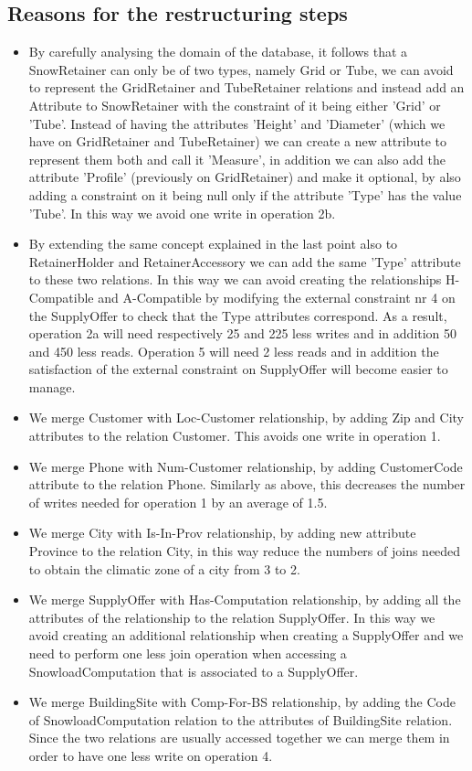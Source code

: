 {\subsection{Reasons for the restructuring steps}
\begin{itemize}
  \item By carefully analysing the domain of the database, it follows that a SnowRetainer can only be of two types, namely Grid or Tube, we can avoid to represent the GridRetainer and TubeRetainer relations and instead add an Attribute to SnowRetainer with the constraint of it being either 'Grid' or 'Tube'. Instead of having the attributes 'Height' and 'Diameter' (which we have on GridRetainer and TubeRetainer) we can create a new attribute to represent them both and call it 'Measure', in addition we can also add the attribute 'Profile' (previously on GridRetainer) and make it optional, by also adding a constraint on it being null only if the attribute 'Type' has the value 'Tube'. In this way we avoid one write in operation 2b.
  \item By extending the same concept explained in the last point also to RetainerHolder and RetainerAccessory we can add the same 'Type' attribute to these two relations. In this way we can avoid creating the relationships H-Compatible and A-Compatible by modifying the external constraint nr 4 on the SupplyOffer to check that the Type attributes correspond. As a result, operation 2a will need respectively 25 and 225 less writes and in addition 50 and 450 less reads. Operation 5 will need 2 less reads and in addition the satisfaction of the external constraint on SupplyOffer will become easier to manage.
  \item We merge Customer with Loc-Customer relationship, by adding Zip and City attributes to the relation Customer. This avoids one write in operation 1.
  \item We merge Phone with Num-Customer relationship, by adding CustomerCode attribute to the relation Phone. Similarly as above, this decreases the number of writes needed for operation 1 by an average of 1.5.
  \item We merge City with Is-In-Prov relationship, by adding new attribute Province to the relation City, in this way reduce the numbers of joins needed to obtain the climatic zone of a city from 3 to 2.
  \item We merge SupplyOffer with Has-Computation relationship, by adding all the attributes of the relationship to the relation SupplyOffer. In this way we avoid creating an additional relationship when creating a SupplyOffer and we need to perform one less join operation when accessing a SnowloadComputation that is associated to a SupplyOffer.
  \item We merge BuildingSite with Comp-For-BS relationship, by adding the Code of SnowloadComputation relation to the  attributes of BuildingSite relation. Since the two relations are usually accessed together we can merge them in order to have one less write on operation 4.
\end{itemize}

}
